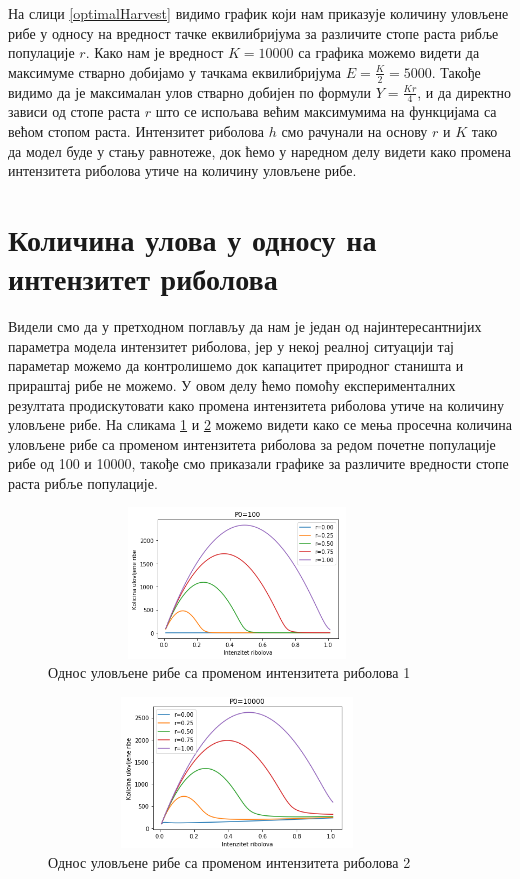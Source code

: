\documentclass[a4paper]{article}
\begin{document}
{На слици \ref{optimalHarvest} видимо график који нам приказује количину уловљене рибе у односу на вредност тачке еквилибријума за различите стопе раста рибље популације $r$. Како нам је вредност $K=10000$ са графика можемо видети да максимуме стварно добијамо у тачкама еквилибријума $E=\frac{K}{2}=5000$. Такође видимо да је максималан улов стварно добијен по формули $Y=\frac{Kr}{4}$, и да директно зависи од стопе раста $r$ што се испољава већим максимумима на функцијама са већом стопом раста. Интензитет риболова $h$ смо рачунали на основу $r$ и $K$ тако да модел буде у стању равнотеже, док ћемо у наредном делу видети како промена интензитета риболова утиче на количину уловљене рибе.


\section{Количина улова у односу на интензитет риболова}
\label{sec:fishingintensity}
 Видели смо да у претходном поглављу да нам је један од најинтересантнијих параметра модела интензитет риболова, јер у некој реалној ситуацији тај параметар можемо да контролишемо док капацитет природног станишта и прираштај рибе не можемо. У овом делу ћемо помоћу експерименталних резултата продискутовати како промена интензитета риболова утиче на количину уловљене рибе. На сликама \ref{intensityincrease1} и \ref{intensityincrease2} можемо видети како се мења просечна количина уловљене рибе са променом интензитета риболова за редом почетне популације рибе од 100 и 10000, такође смо приказали графике за различите вредности стопе раста рибље популације.
 
\begin{figure}[h!]
	\centering
	\includegraphics[width=10cm,height=4.0cm]{images/IntenzityChangeP100.png}
	\caption{Однос уловљене рибе са променом интензитета риболова 1}
	\label{intensityincrease1}
\end{figure}
 
 \begin{figure}[h!]
	\centering
	\includegraphics[width=10cm,height=4.0cm]{images/IntenzityChangeP10000.png}
	\caption{Однос уловљене рибе са променом интензитета риболова 2}
	\label{intensityincrease2}
\end{figure}

}
\end{document}

